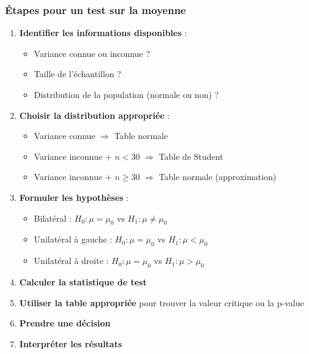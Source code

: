 \documentclass[11pt,a4paper]{article}
\begin{document}
\subsubsection{Étapes pour un test sur la moyenne}

\begin{enumerate}
    \item \textbf{Identifier les informations disponibles} :
    \begin{itemize}
        \item Variance connue ou inconnue ?
        \item Taille de l'échantillon ?
        \item Distribution de la population (normale ou non) ?
    \end{itemize}
    
    \item \textbf{Choisir la distribution appropriée} :
    \begin{itemize}
        \item Variance connue $\Rightarrow$ Table normale
        \item Variance inconnue + $n < 30$ $\Rightarrow$ Table de Student
        \item Variance inconnue + $n \geq 30$ $\Rightarrow$ Table normale (approximation)
    \end{itemize}
    
    \item \textbf{Formuler les hypothèses} :
    \begin{itemize}
        \item Bilatéral : $H_0 : \mu = \mu_0$ vs $H_1 : \mu \neq \mu_0$
        \item Unilatéral à gauche : $H_0 : \mu = \mu_0$ vs $H_1 : \mu < \mu_0$
        \item Unilatéral à droite : $H_0 : \mu = \mu_0$ vs $H_1 : \mu > \mu_0$
    \end{itemize}
    
    \item \textbf{Calculer la statistique de test}
    
    \item \textbf{Utiliser la table appropriée} pour trouver la valeur critique ou la p-value
    
    \item \textbf{Prendre une décision}
    
    \item \textbf{Interpréter les résultats}
\end{enumerate}
\end{document}
